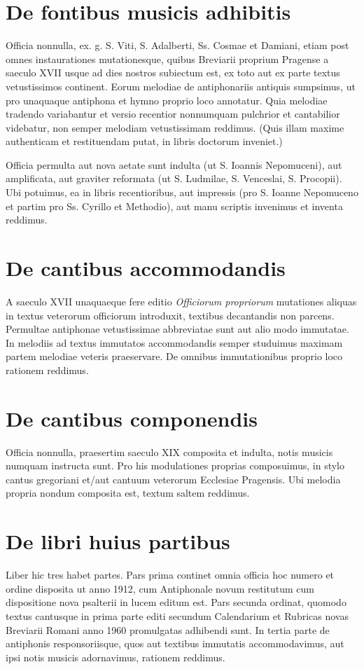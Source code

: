 \section*{De fontibus musicis adhibitis}
Officia nonnulla, ex. g. S. Viti, S. Adalberti, Ss. Cosmae et Damiani,
etiam post omnes instaurationes mutationesque, quibus
Breviarii proprium Pragense a saeculo XVII usque ad dies nostros
subiectum est, ex toto aut ex parte textus vetustissimos
continent.
Eorum melodiae de antiphonariis antiquis sumpsimus,
ut pro unaquaque antiphona et hymno proprio loco annotatur.
Quia melodiae tradendo variabantur et versio recentior nonnumquam
pulchrior et cantabilior videbatur, non semper melodiam
vetustissimam reddimus.
(Quis illam maxime authenticam et restituendam putat,
in libris doctorum inveniet.)

Officia permulta aut nova aetate sunt indulta
(ut S. Ioannis Nepomuceni),
aut amplificata,
aut graviter reformata (ut S. Ludmilae, S. Venceslai, S. Procopii).
Ubi potuimus, ea in libris recentioribus, aut impressis
(pro S. Ioanne Nepomuceno et partim pro Ss. Cyrillo et Methodio),
aut manu scriptis invenimus et inventa reddimus.

\section*{De cantibus accommodandis}
A saeculo XVII unaquaeque fere editio \emph{Officiorum propriorum}
mutationes aliquas in textus veterorum officiorum introduxit,
textibus decantandis non parcens.
Permultae antiphonae vetustissimae abbreviatae sunt aut
alio modo immutatae.
In melodiis ad textus immutatos accommodandis semper studuimus
maximam partem melodiae veteris praeservare.
De omnibus immutationibus proprio loco rationem reddimus.

\section*{De cantibus componendis}
Officia nonnulla, praesertim saeculo XIX composita et indulta,
notis musicis numquam instructa sunt.
Pro his modulationes proprias composuimus, in stylo cantus gregoriani
et/aut cantuum veterorum Ecclesiae Pragensis.
Ubi melodia propria nondum composita est, textum saltem reddimus.

\section*{De libri huius partibus}
Liber hic
tres
habet partes.
Pars prima continet omnia officia hoc numero et ordine disposita
ut anno 1912, cum Antiphonale novum restitutum
cum dispositione nova psalterii in lucem editum est.
Pars secunda ordinat, quomodo textus cantusque in prima parte
editi secundum Calendarium et Rubricas novas Breviarii Romani
anno 1960 promulgatas adhibendi sunt.
In tertia parte de antiphonis responsoriisque,
quos aut textibus immutatis accommodavimus,
aut ipsi notis musicis adornavimus, rationem reddimus.
